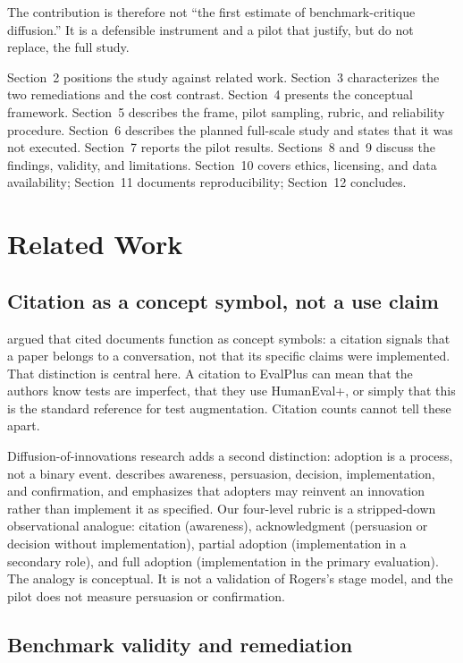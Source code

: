 \documentclass[11pt,a4paper]{article}
\begin{document}
The contribution is therefore not ``the first estimate of benchmark-critique diffusion.'' It is a defensible instrument and a pilot that justify, but do not replace, the full study.

Section~2 positions the study against related work. Section~3 characterizes the two remediations and the cost contrast. Section~4 presents the conceptual framework. Section~5 describes the frame, pilot sampling, rubric, and reliability procedure. Section~6 describes the planned full-scale study and states that it was not executed. Section~7 reports the pilot results. Sections~8 and~9 discuss the findings, validity, and limitations. Section~10 covers ethics, licensing, and data availability; Section~11 documents reproducibility; Section~12 concludes.

\section{Related Work}

\subsection{Citation as a concept symbol, not a use claim}

\citet{small1978} argued that cited documents function as concept symbols: a citation signals that a paper belongs to a conversation, not that its specific claims were implemented. That distinction is central here. A citation to EvalPlus can mean that the authors know tests are imperfect, that they use HumanEval+, or simply that this is the standard reference for test augmentation. Citation counts cannot tell these apart.

Diffusion-of-innovations research adds a second distinction: adoption is a process, not a binary event. \citet{rogers2003} describes awareness, persuasion, decision, implementation, and confirmation, and emphasizes that adopters may reinvent an innovation rather than implement it as specified. Our four-level rubric is a stripped-down observational analogue: citation (awareness), acknowledgment (persuasion or decision without implementation), partial adoption (implementation in a secondary role), and full adoption (implementation in the primary evaluation). The analogy is conceptual. It is not a validation of Rogers's stage model, and the pilot does not measure persuasion or confirmation.

\subsection{Benchmark validity and remediation}
\end{document}
